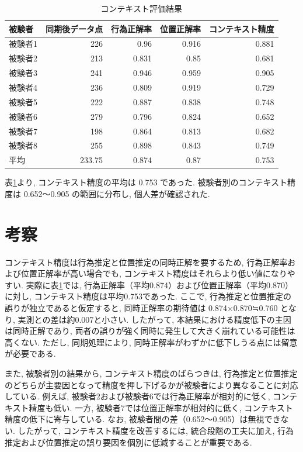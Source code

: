 \documentclass[a4paper,12pt]{jreport}
\begin{document}
\begin{table}[tb]
  \centering
  \caption{コンテキスト評価結果}
  \label{tab:context}
  \renewcommand{\arraystretch}{1.2}
  \small
  \begin{tabular}{|l|r|r|r|r|}
    \hline
被験者 & 同期後データ点 & 行為正解率 & 位置正解率 & コンテキスト精度 \\ \hline
被験者1 & 226 & 0.96 & 0.916 & 0.881 \\ \hline
被験者2 & 213 & 0.831 & 0.85 & 0.681 \\ \hline
被験者3 & 241 & 0.946 & 0.959 & 0.905 \\ \hline
被験者4 & 236 & 0.809 & 0.919 & 0.729 \\ \hline
被験者5 & 222 & 0.887 & 0.838 & 0.748 \\ \hline
被験者6 & 279 & 0.796 & 0.824 & 0.652 \\ \hline
被験者7 & 198 & 0.864 & 0.813 & 0.682 \\ \hline
被験者8 & 255 & 0.898 & 0.843 & 0.749 \\ \hline
平均 & 233.75 & 0.874 & 0.87 & 0.753 \\ \hline
  \end{tabular}
\end{table}

表\ref{tab:context}より, コンテキスト精度の平均は 0.753 であった. 被験者別のコンテキスト精度は 0.652〜0.905 の範囲に分布し, 個人差が確認された. 


\section{考察}
コンテキスト精度は行為推定と位置推定の同時正解を要するため, 行為正解率および位置正解率が高い場合でも, コンテキスト精度はそれらより低い値になりやすい. 実際に表\ref{tab:context}では, 行為正解率（平均0.874）および位置正解率（平均0.870）に対し, コンテキスト精度は平均0.753であった. ここで, 行為推定と位置推定の誤りが独立であると仮定すると, 同時正解率の期待値は 0.874×0.870≒0.760 となり, 実測との差は約0.007と小さい. したがって, 本結果における精度低下の主因は同時正解であり, 両者の誤りが強く同時に発生して大きく崩れている可能性は高くない. ただし, 同期処理により, 同時正解率がわずかに低下しうる点には留意が必要である. 

また, 被験者別の結果から, コンテキスト精度のばらつきは, 行為推定と位置推定のどちらが主要因となって精度を押し下げるかが被験者により異なることに対応している. 例えば, 被験者2および被験者6では行為正解率が相対的に低く, コンテキスト精度も低い. 一方, 被験者7では位置正解率が相対的に低く, コンテキスト精度の低下に寄与している. なお, 被験者間の差（0.652～0.905）は無視できない. したがって, コンテキスト精度を改善するには, 統合段階の工夫に加え, 行為推定および位置推定の誤り要因を個別に低減することが重要である. 
\end{document}
